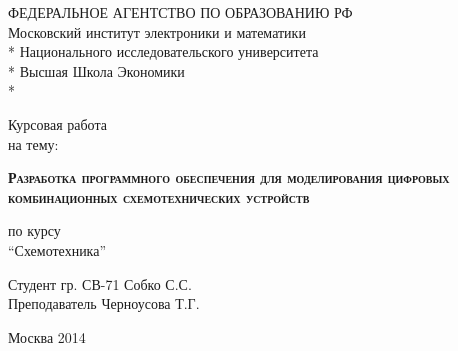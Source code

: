 \begin{titlepage}
\newpage

\begin{center}
ФЕДЕРАЛЬНОЕ АГЕНТСТВО ПО ОБРАЗОВАНИЮ РФ \\
\vspace{1cm}
Московский институт электроники и математики \\*
Национального исследовательского университета \\*
Высшая Школа Экономики \\*
\hrulefill
\end{center}
 

\vspace{5em}

\begin{center}
\Large Курсовая работа \\ на тему:
\end{center}

\vspace{2.0em}
 
\begin{center}
\textsc{\textbf{Разработка программного обеспечения для моделирования \linebreak
цифровых комбинационных схемотехнических устройств}}
\end{center}

\begin{center}
по курсу \\ ``Схемотехника''
\end{center}

\vspace{5em}
 
\begin{flushleft}
Студент гр. СВ-71 \hrulefill Собко С.С. \\
\vspace{1.0em}
Преподаватель \hrulefill Черноусова Т.Г.
\end{flushleft}
 
\vspace{\fill}

\begin{center}
Москва 2014
\end{center}

\end{titlepage}